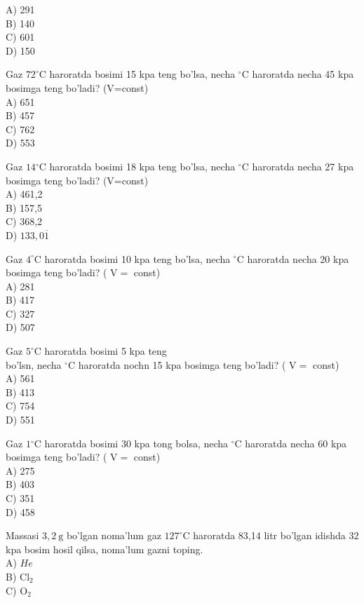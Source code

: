 A) 291\\
B) 140\\
C) 601\\
D) 150
  \item Gaz $72^{\circ} \mathrm{C}$ haroratda bosimi 15 kpa teng bo'lsa, necha ${ }^{\circ} \mathrm{C}$ haroratda necha 45 kpa bosimga teng bo'ladi? (V=const)\\
A) 651\\
B) 457\\
C) 762\\
D) 553
  \item Gaz $14{ }^{\circ} \mathrm{C}$ haroratda bosimi 18 kpa teng bo'lsa, necha ${ }^{\circ} \mathrm{C}$ haroratda necha 27 kpa bosimga teng bo'ladi? (V=const)\\
A) 461,2\\
B) 157,5\\
C) 368,2\\
D) $133,0 \overline{1}$
  \item Gaz $4^{\circ} \mathrm{C}$ haroratda bosimi 10 kpa teng bo'lsa, necha ${ }^{\circ} \mathrm{C}$ haroratda necha 20 kpa bosimga teng bo'ladi? ( $\mathrm{V}=$ const)\\
A) 281\\
B) 417\\
C) 327\\
D) 507
  \item Gaz $5^{\circ} \mathrm{C}$ haroratda bosimi 5 kpa teng\\
bo'lsn, necha ${ }^{\circ} \mathrm{C}$ haroratda nochn 15 kpa bosimga teng bo'ladi? ( $\mathrm{V}=$ const)\\
A) 561\\
B) 413\\
C) 754\\
D) 551
  \item Gaz $1{ }^{\circ} \mathrm{C}$ haroratda bosimi 30 kpa tong bolsa, necha ${ }^{\circ} \mathrm{C}$ haroratda necha 60 kpa bosimga teng bo'ladi? ( $\mathrm{V}=$ const)\\
A) 275\\
B) 403\\
C) 351\\
D) 458
  \item Massasi $3,2 \mathrm{~g}$ bo'lgan noma'lum gaz $127^{\circ} \mathrm{C}$ haroratda 83,14 litr bo'lgan idishda 32 kpa bosim hosil qilsa, noma'lum gazni toping.\\
A) $He$\\
B) $\mathrm{Cl}_{2}$\\
C) $\mathrm{O}_{2}$\\
